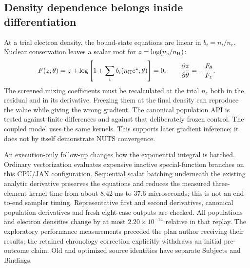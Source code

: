 \documentclass[11pt,a4paper]{article}
\begin{document}
\subsection{Density dependence belongs inside differentiation}
At a trial electron density, the bound-state equations are linear in
$b_i=n_i/n_e$. Nuclear conservation leaves a scalar root for
$z=\log(n_e/n_{\rm H})$:
\[
F(z;\theta)=z+\log\left[1+\sum_i b_i(n_{\rm H}e^z;\theta)\right]=0,
\qquad \frac{\partial z}{\partial\theta}=-\frac{F_\theta}{F_z}.
\]
The screened mixing coefficients must be recalculated at the trial $n_e$ both
in the residual and in its derivative. Freezing them at the final density can
reproduce the value while giving the wrong gradient. The canonical population
API is tested against finite differences and against that deliberately frozen
control. The coupled model uses the same kernels. This supports later gradient
inference; it does not by itself demonstrate NUTS convergence.

An execution-only follow-up changes how the exponential integral is batched.
Ordinary vectorization evaluates expensive inactive special-function branches
on this CPU/JAX configuration. Sequential scalar batching underneath the
existing analytic derivative preserves the equations and reduces the measured
three-element kernel time from about 8.42 ms to 37.6 microseconds; this is not
an end-to-end sampler timing. Representative first and second derivatives,
canonical population derivatives and fresh eight-case outputs are checked.
All populations and electron densities change by at most
$2.20\times10^{-14}$ relative in that replay. The exploratory performance
measurements preceded the plan author receiving their results; the retained
chronology correction explicitly withdraws an initial pre-outcome claim.
Old and optimized source identities have separate Subjects and Bindings.
\end{document}
